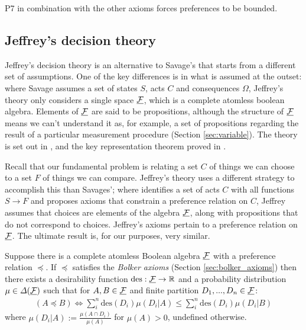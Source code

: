 P7 in combination with the other axioms forces preferences to be bounded.

\subsection{Jeffrey's decision theory}

Jeffrey's decision theory is an alternative to Savage's that starts from a different set of assumptions. One of the key differences is in what is assumed at the outset: where Savage assumes a set of states $S$, acts $C$ and consequences $\Omega$, Jeffrey's theory only considers a single space $\underline{\mathcal{F}}$, which is a complete atomless boolean algebra. Elements of $\underline{\mathcal{F}}$ are said to be propositions, although the structure of $\underline{\mathcal{F}}$ means we can't understand it as, for example, a set of propositions regarding the result of a particular measurement procedure (Section \ref{sec:variable}). The theory is set out in \citet{jeffrey_logic_1990}, and the key representation theorem proved in \citet{bolker_functions_1966}.

Recall that our fundamental problem is relating a set $C$ of things we can choose to a set $F$ of things we can compare. Jeffrey's theory uses a different strategy to accomplish this than Savages'; where identifies a set of acts $C$ with all functions $S\to F$ and proposes axioms that constrain a preference relation on $C$, Jeffrey assumes that choices are elements of the algebra $\underline{\mathcal{F}}$, along with propositions that do not correspond to choices. Jeffrey's axioms pertain to a preference relation on $\underline{\mathcal{F}}$. The ultimate result is, for our purposes, very similar.

\begin{theorem}\label{th:bolker_jeffrey}
Suppose there is a complete atomless Boolean algebra $\underline{\mathcal{F}}$ with a preference relation $\preceq$. If $\preceq$ satisfies the \emph{Bolker axioms} (Section \ref{sec:bolker_axioms}) then there exists a desirability function $\text{des}:\underline{\mathcal{F}}\to\mathbb{R}$ and a probability distribution $\mu\in \Delta(\underline{\mathcal{F}})$ such that for $A,B\in \underline{\mathcal{F}}$ and finite partition $D_1,...,D_n\in \underline{\mathcal{F}}$:
\begin{align}
    (A \preceq B) \iff \sum_{i}^n \text{des}(D_i) \mu(D_i|A) \leq \sum_{i}^n \text{des}(D_i) \mu(D_i|B) \label{eq:ev_dec_theory}
\end{align}
where $\mu(D_i|A):=\frac{\mu(A\cap D_i)}{\mu(A)}$ for $\mu(A)>0$, undefined otherwise.
\end{theorem}

